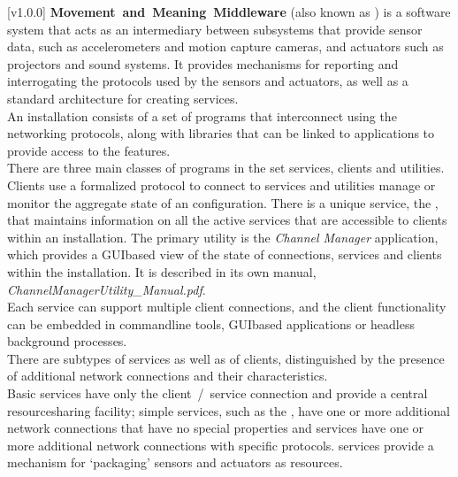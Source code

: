 [v1.0.0]
\textbf{Movement~and~Meaning~Middleware} (also known as \mplusm) is a software system
that acts as an intermediary between subsystems that provide sensor data, such as
accelerometers and motion capture cameras, and actuators such as projectors and sound
systems.
It provides mechanisms for reporting and interrogating the protocols used by the sensors
and actuators, as well as a standard architecture for creating services.\\

An \mplusm{} installation consists of a set of programs that interconnect using the
 networking
protocols, along with libraries that can be linked to applications to provide access to
the \mplusm{} features.\\

There are three main classes of programs in the set \longDash{} services, clients and
utilities.
Clients use a formalized protocol to connect to services and utilities manage or monitor
the aggregate state of an \mplusm{} configuration.
There is a unique service, the , that
maintains information on all the active services that are accessible to clients within an
\mplusm{} installation.
The primary utility is the \emph{Channel Manager} application, which provides a
GUI\longDash{}based view of the state of connections, services and clients within the
installation.
It is described in its own manual, \emph{ChannelManagerUtility\_Manual.pdf}.\\

Each service can support multiple client connections, and the client functionality can be
embedded in command\longDash{}line tools, GUI\longDash{}based applications or headless
background processes.\\

There are subtypes of services as well as of clients, distinguished by the presence of
additional \yarp{} network connections and their characteristics.\\

Basic services have only the client~/~service \yarp{} connection and provide a central
resource\longDash{}sharing facility; simple services, such as the
, have one or more additional \yarp{}
network connections that have no special properties and  services have one
or more additional \yarp{} network connections with specific protocols.
 services provide a mechanism for `packaging' sensors and actuators as
\mplusm{} resources.\\

